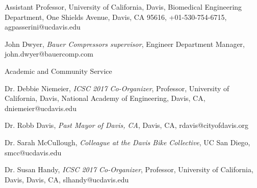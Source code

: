 \documentclass[10pt]{article}
\newenvironment{outerlist}[1][\enskip\textbullet]%
        {\begin{itemize}[#1]}{\end{itemize}%
         \vspace{-.6\baselineskip}}
\newenvironment{innerlist}[1][\enskip\textbullet]%
        {\begin{compactitem}[#1]}{\end{compactitem}}
\begin{document}
\begin{outerlist}
\begin{innerlist}
        Assistant Professor,
        University of California, Davis,
        Biomedical Engineering Department,
        One Shields Avenue, Davis, CA 95616,
        +01-530-754-6715,
        agpasserini@ucdavis.edu
      \item John Dwyer,
        \emph{Bauer Compressors supervisor},
        Engineer Department Manager,
        john.dwyer@bauercomp.com
    \end{innerlist}
  \item[] Academic and Community Service
    \begin{innerlist}
      \item Dr. Debbie Niemeier,
        \emph{ICSC 2017 Co-Organizer},
        Professor,
        University of California, Davis,
        National Academy of Engineering,
        Davis, CA,
        dniemeier@ucdavis.edu
      \item Dr. Robb Davis,
        \emph{Past Mayor of Davis, CA},
        Davis, CA,
        rdavis@cityofdavis.org
      \item Dr. Sarah McCullough,
        \emph{Colleague at the Davis Bike Collective},
        UC San Diego,
        smcc@ucdavis.edu
      \item Dr. Susan Handy,
        \emph{ICSC 2017 Co-Organizer},
        Professor,
        University of California, Davis,
        Davis, CA,
        slhandy@ucdavis.edu
    \end{innerlist}
\end{outerlist}
%
\end{document}

